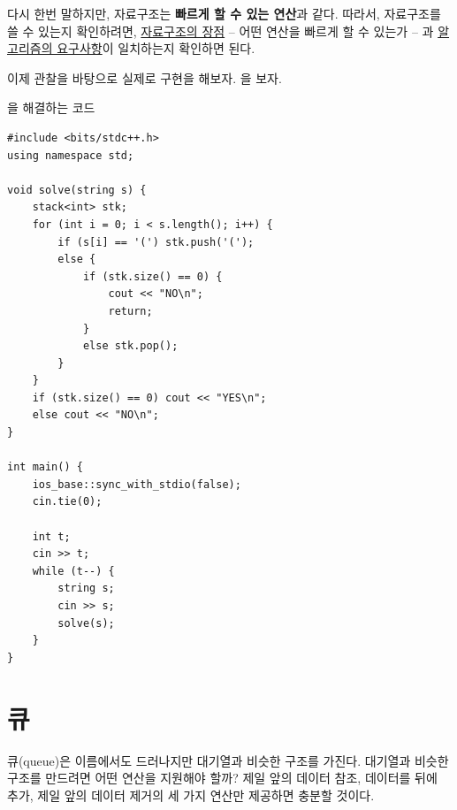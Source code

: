 다시 한번 말하지만, 자료구조는 \textbf{빠르게 할 수 있는 연산}과 같다. 따라서, 자료구조를 쓸 수 있는지 확인하려면, \underline{자료구조의 장점} -- 어떤 연산을 빠르게 할 수 있는가 -- 과 \underline{알고리즘의 요구사항}이 일치하는지 확인하면 된다.

이제 관찰을 바탕으로 실제로 구현을 해보자. 을 보자.

\begin{code} \label{code: bracket-matching}
을 해결하는 코드
\begin{lstlisting}
#include <bits/stdc++.h>
using namespace std;

void solve(string s) {
    stack<int> stk;
    for (int i = 0; i < s.length(); i++) {
        if (s[i] == '(') stk.push('(');
        else {
            if (stk.size() == 0) {
                cout << "NO\n";
                return;
            }
            else stk.pop();
        }
    }
    if (stk.size() == 0) cout << "YES\n";
    else cout << "NO\n";
}

int main() {
    ios_base::sync_with_stdio(false);
    cin.tie(0);
    
    int t;
    cin >> t;
    while (t--) {
        string s;
        cin >> s;
        solve(s);
    }
}
\end{lstlisting}
\end{code}

\section{큐}
큐(queue)은 이름에서도 드러나지만 대기열과 비슷한 구조를 가진다. 대기열과 비슷한 구조를 만드려면 어떤 연산을 지원해야 할까? 제일 앞의 데이터 참조, 데이터를 뒤에 추가, 제일 앞의 데이터 제거의 세 가지 연산만 제공하면 충분할 것이다.

\begin{figure}[htbp]
    \centering
\end{figure}

